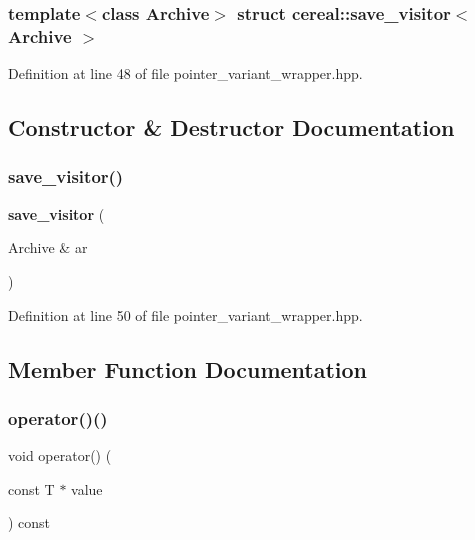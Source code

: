 \subsubsection*{template$<$class Archive$>$\newline
struct cereal\+::save\+\_\+visitor$<$ Archive $>$}



Definition at line 48 of file pointer\+\_\+variant\+\_\+wrapper.\+hpp.



\subsection{Constructor \& Destructor Documentation}
\mbox{\label{structcereal_1_1save__visitor_a79d9c557965a3a81a894a6ce856c1757}} 
\subsubsection{save\+\_\+visitor()}
{\footnotesize\ttfamily \textbf{ save\+\_\+visitor} (\begin{DoxyParamCaption}\item[{Archive \&}]{ar }\end{DoxyParamCaption})\hspace{0.3cm}{\ttfamily [inline]}}



Definition at line 50 of file pointer\+\_\+variant\+\_\+wrapper.\+hpp.



\subsection{Member Function Documentation}
\mbox{\label{structcereal_1_1save__visitor_a4e892b7d0489cc782bac3eeca6de2415}} 
\subsubsection{operator()()\hspace{0.1cm}{\footnotesize\ttfamily [1/2]}}
{\footnotesize\ttfamily void operator() (\begin{DoxyParamCaption}\item[{const T $\ast$}]{value }\end{DoxyParamCaption}) const\hspace{0.3cm}{\ttfamily [inline]}}



